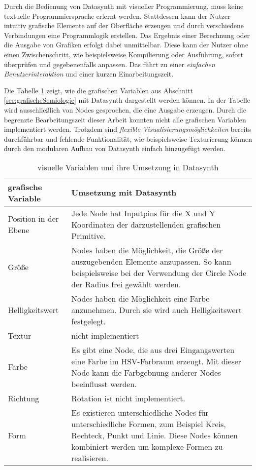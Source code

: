 \documentclass[a4paper, 12pt, DIV=calc, version=first, pdftex, headsepline, footsepline, bibtotocnumbered, liststotocnumbered]{scrreprt}
\begin{document}
Durch die Bedienung von Datasynth mit visueller Programmierung, muss keine
textuelle Programmiersprache erlernt werden. Stattdessen kann der Nutzer intuitiv
grafische Elemente auf der Oberfläche erzeugen und durch verschiedene Verbindungen
eine Programmlogik erstellen. Das Ergebnis einer Berechnung oder die Ausgabe von
Grafiken erfolgt dabei unmittelbar. Diese kann der Nutzer
ohne einen Zwischenschritt, wie beispielsweise Kompilierung oder Ausführung,
sofort überprüfen und gegebenenfalls anpassen. Das führt zu einer
\textit{einfachen Benutzerinteraktion} und einer kurzen Einarbeitungszeit.

Die Tabelle \ref{tab:vars} zeigt, wie die grafischen Variablen aus Abschnitt
\ref{sec:grafischeSemiologie} mit Datasynth dargestellt werden können. In der Tabelle wird ausschließlich
von Nodes gesprochen, die eine Ausgabe erzeugen.
Durch die begrenzte Bearbeitungszeit dieser Arbeit konnten nicht alle grafischen
Variablen implementiert werden. Trotzdem sind \textit{flexible Visualisierungsmöglichkeiten}
bereits durchführbar und fehlende Funktionalität, wie beispielsweise Texturierung können
durch den modularen Aufbau von Datasynth einfach hinzugefügt werden.
\begin{table}
\centering
\begin{tabular}{|l|p{9cm}|}
\hline
\textbf{grafische Variable} & \textbf{Umsetzung mit Datasynth}\\
\hline
Position in der Ebene & Jede Node hat Inputpins für die X und Y Koordinaten der darzustellenden grafischen Primitive.\\
\hline
Größe & Nodes haben die Möglichkeit, die Größe der auszugebenden Elemente anzupassen.
So kann beispielsweise bei der Verwendung der Circle Node der Radius frei gewählt werden.\\
\hline
Helligkeitswert & Nodes haben die Möglichkeit eine Farbe anzunehmen. Durch sie wird
auch Helligkeitswert festgelegt.\\
\hline
Textur & nicht implementiert\\
\hline
Farbe & Es gibt eine Node, die aus drei Eingangswerten eine Farbe im HSV-Farbraum erzeugt. Mit dieser Node kann die Farbgebnung
anderer Nodes beeinflusst werden.\\
\hline
Richtung & Rotation ist nicht implementiert.\\
\hline
Form & Es existieren unterschiedliche Nodes für unterschiedliche Formen, zum Beispiel Kreis, Rechteck, Punkt und Linie. Diese Nodes
können kombiniert werden um komplexe Formen zu realisieren.\\
\hline
\end{tabular}
\caption{visuelle Variablen und ihre Umsetzung in Datasynth}
\label{tab:vars}
\end{table}
\end{document}
